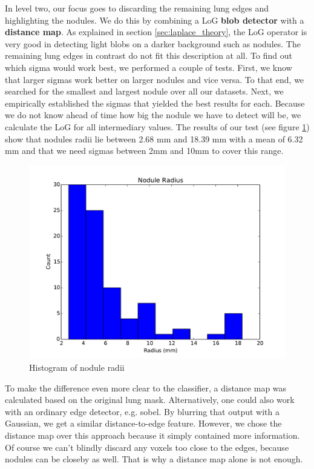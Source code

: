 In level two, our focus goes to discarding the remaining lung edges and
highlighting the nodules. We do this by combining a LoG \textbf{blob detector}
with a \textbf{distance map}. As explained in section \ref{sec:laplace_theory},
the LoG operator is very good in detecting light blobs on a darker background
such as nodules. The remaining lung edges in contrast do not fit this
description at all. To find out which sigma would work best, we performed a
couple of tests. First, we know that larger sigmas work better on larger nodules
and vice versa. To that end, we searched for the smallest and largest nodule
over all our datasets. Next, we empirically established the sigmas that yielded
the best results for each. Because we do not know ahead of time how big the
nodule we have to detect will be, we calculate the LoG for all intermediary
values. The results of our test (see figure \ref{fig:radii}) show that nodules
radii lie between 2.68 mm and 18.39 mm with a mean of 6.32 mm and that
we need sigmas between 2mm and 10mm to cover this range.

\begin{figure}[ht]
\begin{center}
  \includegraphics[width=\linewidth]{img/MaxNoduleRadii.pdf}
  \caption{Histogram of nodule radii}
  \label{fig:radii}
\end{center}
\end{figure}

To make the difference even more clear to the classifier, a distance map was
calculated based on the original lung mask. Alternatively, one could also work
with an ordinary edge detector, e.g. sobel. By blurring that output with a
Gaussian, we get a similar distance-to-edge feature. However, we chose the
distance map over this approach because it simply contained more information. Of
course we can't blindly discard any voxels too close to the edges, because
nodules can be closeby as well. That is why a distance map alone is not enough.

